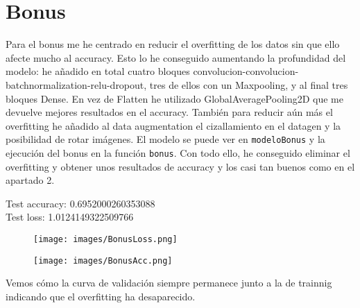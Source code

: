 \documentclass[12pt]{article}
\begin{document}
\section*{Bonus}
Para el bonus me he centrado en reducir el overfitting de los datos sin que ello afecte mucho al accuracy. Esto lo he conseguido aumentando la profundidad del modelo: he añadido en total cuatro bloques convolucion-convolucion-batchnormalization-relu-dropout, tres de ellos con un Maxpooling, y al final tres bloques Dense. En vez de Flatten he utilizado GlobalAveragePooling2D que me devuelve mejores resultados en el accuracy. También para reducir aún más el overfitting he añadido al data augmentation el cizallamiento en el datagen y la posibilidad de rotar imágenes. El modelo se puede ver en \texttt{modeloBonus} y la ejecución del bonus en la función \texttt{bonus}. Con todo ello, he conseguido eliminar el overfitting y obtener unos resultados de accuracy y los casi tan buenos como en el apartado 2.\\
\begin{center}
Test accuracy: 0.6952000260353088\\
Test loss: 1.0124149322509766
\end{center}
\begin{figure}[H]
\centering
\parbox{8cm}{
\texttt{[image: images/BonusLoss.png]}
\caption{}
\label{fig:2figsA}}
\begin{minipage}{8cm}
\texttt{[image: images/BonusAcc.png]}
\caption{}
\label{fig:2figsB}
\end{minipage}
\end{figure}
Vemos cómo la curva de validación siempre permanece junto a la de trainnig indicando que el overfitting ha desaparecido.
 
\end{document}
